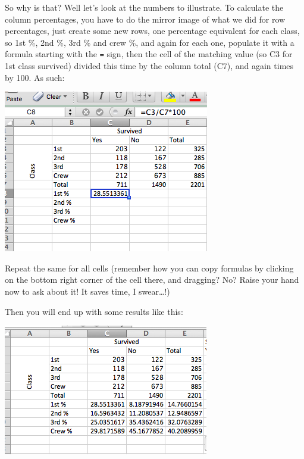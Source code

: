 \documentclass[
]{book}
\begin{document}
So why is that? Well let's look at the numbers to illustrate. To calculate the column percentages, you have to do the mirror image of what we did for row percentages, just create some new rows, one percentage equivalent for each class, so 1st \%, 2nd \%, 3rd \% and crew \%, and again for each one, populate it with a formula starting with the \texttt{=} sign, then the cell of the matching value (so C3 for 1st class survived) divided this time by the column total (C7), and again times by 100. As such:

\includegraphics{imgs/col_perc_calc.png}

Repeat the same for all cells (remember how you can copy formulas by clicking on the bottom right corner of the cell there, and dragging? No? Raise your hand now to ask about it! It saves time, I swear\ldots!)

Then you will end up with some results like this:

\includegraphics{imgs/all_col_perc.png}
\end{document}
